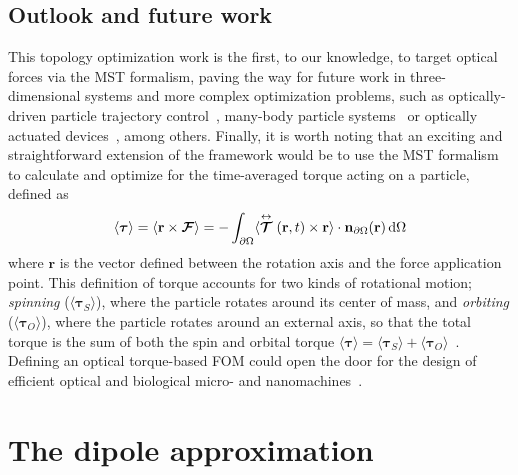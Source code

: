 \subsection*{Outlook and future work}

This topology optimization work is the first, to our knowledge, to 
target optical forces via the MST formalism, paving the way for future work in three-dimensional systems and more complex optimization problems, such as optically-driven particle
trajectory control~\cite{zemanek_perspective_2019, macdonald_microfluidic_2003, shilkin_directional_2017}, many-body particle systems~\cite{bechinger_active_2016, chang_colloquium_2018} or optically actuated devices~\cite{ivanyi_optically_2024}, among others.
Finally, it is worth noting that an exciting and straightforward extension of the framework would be to use the MST formalism to calculate and optimize for the time-averaged torque acting on a particle, defined as~\cite{novotny}
\begin{equation}\label{eq:torque}
    \langle \bm{\tau} \rangle = \langle \mathbf{r} \times \bm{\mathcal{F}} \rangle = - \int_{\partial \Omega} \langle \stackrel{\leftrightarrow}{\bm{\mathcal{T}}}(\mathbf{r},t)
    \times \mathbf{r} \rangle \cdot \mathbf{n}_{\partial \Omega}(\mathbf{r}) \mathop{}\!\text{d}\Omega 
\end{equation}
where $\mathbf{r}$ is the vector defined between the rotation axis and the force application point. This definition of torque accounts
for two kinds of rotational motion; \textit{spinning} ($\langle \bm{\tau}_S \rangle$), where the particle rotates around its center of mass,
and \textit{orbiting} ($\langle \bm{\tau}_O \rangle$), where the particle rotates around an external axis, so that the total torque is the sum
of both the spin and orbital torque $\langle \bm{\tau} \rangle = \langle \bm{\tau}_S \rangle + \langle \bm{\tau}_O \rangle$~\cite{torque}.  Defining 
an optical torque-based FOM could open the door for the design of efficient optical and biological micro- and nanomachines~\cite{rotating, gluck}.

\section{The dipole approximation~\cite{ownpub1, ownpub3}}\label{sec:dip}

